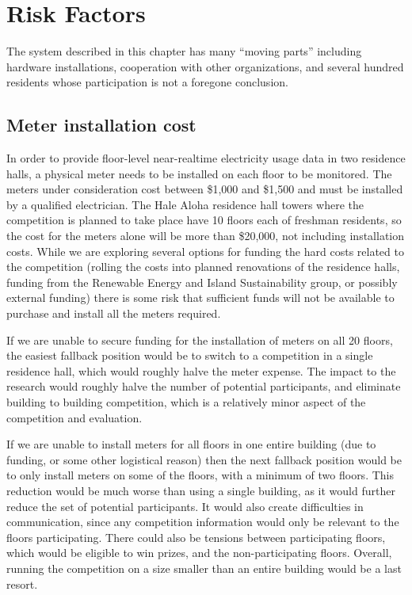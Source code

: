 \section{Risk Factors}
\label{sec:risks}

The system described in this chapter has many ``moving parts'' including hardware installations, cooperation with other organizations, and several hundred residents whose participation is not a foregone conclusion.

\subsection{Meter installation cost}

In order to provide floor-level near-realtime electricity usage data in two residence halls, a physical meter needs to be installed on each floor to be monitored. The meters under consideration cost between \$1,000 and \$1,500 and must be installed by a qualified electrician. The Hale Aloha residence hall towers where the competition is planned to take place have 10 floors each of freshman residents, so the cost for the meters alone will be more than \$20,000, not including installation costs. While we are exploring several options for funding the hard costs related to the competition (rolling the costs into planned renovations of the residence halls, funding from the Renewable Energy and Island Sustainability group, or possibly external funding) there is some risk that sufficient funds will not be available to purchase and install all the meters required.

If we are unable to secure funding for the installation of meters on all 20 floors, the easiest fallback position would be to switch to a competition in a single residence hall, which would roughly halve the meter expense. The impact to the research would roughly halve the number of potential participants, and eliminate building to building competition, which is a relatively minor aspect of the competition and evaluation.

If we are unable to install meters for all floors in one entire building (due to funding, or some other logistical reason) then the next fallback position would be to only install meters on some of the floors, with a minimum of two floors. This reduction would be much worse than using a single building, as it would further reduce the set of potential participants. It would also create difficulties in communication, since any competition information would only be relevant to the floors participating. There could also be tensions between participating floors, which would be eligible to win prizes, and the non-participating floors. Overall, running the competition on a size smaller than an entire building would be a last resort.

